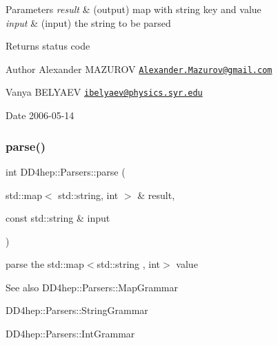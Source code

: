 \begin{DoxyParams}{Parameters}
{\em result} & (output) map with string key and value \\
\hline
{\em input} & (input) the string to be parsed \\
\hline
\end{DoxyParams}
\begin{DoxyReturn}{Returns}
status code
\end{DoxyReturn}
\begin{DoxyAuthor}{Author}
Alexander M\+A\+Z\+U\+R\+OV \href{mailto:Alexander.Mazurov@gmail.com}{\tt Alexander.\+Mazurov@gmail.\+com} 

Vanya B\+E\+L\+Y\+A\+EV \href{mailto:ibelyaev@physics.syr.edu}{\tt ibelyaev@physics.\+syr.\+edu} 
\end{DoxyAuthor}
\begin{DoxyDate}{Date}
2006-\/05-\/14 
\end{DoxyDate}
\hypertarget{namespace_d_d4hep_1_1_parsers_a0bb67dd0bd4f1932c18d9fdf190b0387}{}\label{namespace_d_d4hep_1_1_parsers_a0bb67dd0bd4f1932c18d9fdf190b0387} 
\subsubsection{\texorpdfstring{parse()}{parse()}\hspace{0.1cm}{\footnotesize\ttfamily [9/21]}}
{\footnotesize\ttfamily int D\+D4hep\+::\+Parsers\+::parse (\begin{DoxyParamCaption}\item[{std\+::map$<$ std\+::string, int $>$ \&}]{result,  }\item[{const std\+::string \&}]{input }\end{DoxyParamCaption})}



parse the {\ttfamily std\+::map$<$std\+::string , int$>$} value 

\begin{DoxySeeAlso}{See also}
D\+D4hep\+::\+Parsers\+::\+Map\+Grammar 

D\+D4hep\+::\+Parsers\+::\+String\+Grammar 

D\+D4hep\+::\+Parsers\+::\+Int\+Grammar 
\end{DoxySeeAlso}


